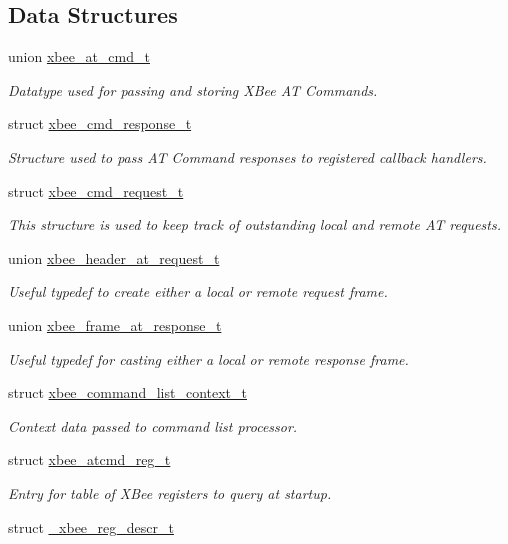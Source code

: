 \subsection*{Data Structures}
\begin{DoxyCompactItemize}
\item 
union \hyperlink{unionxbee__at__cmd__t}{xbee\-\_\-at\-\_\-cmd\-\_\-t}
\begin{DoxyCompactList}\small\item\em Datatype used for passing and storing X\-Bee A\-T Commands. \end{DoxyCompactList}\item 
struct \hyperlink{structxbee__cmd__response__t}{xbee\-\_\-cmd\-\_\-response\-\_\-t}
\begin{DoxyCompactList}\small\item\em Structure used to pass A\-T Command responses to registered callback handlers. \end{DoxyCompactList}\item 
struct \hyperlink{structxbee__cmd__request__t}{xbee\-\_\-cmd\-\_\-request\-\_\-t}
\begin{DoxyCompactList}\small\item\em This structure is used to keep track of outstanding local and remote A\-T requests. \end{DoxyCompactList}\item 
union \hyperlink{unionxbee__header__at__request__t}{xbee\-\_\-header\-\_\-at\-\_\-request\-\_\-t}
\begin{DoxyCompactList}\small\item\em Useful typedef to create either a local or remote request frame. \end{DoxyCompactList}\item 
union \hyperlink{unionxbee__frame__at__response__t}{xbee\-\_\-frame\-\_\-at\-\_\-response\-\_\-t}
\begin{DoxyCompactList}\small\item\em Useful typedef for casting either a local or remote response frame. \end{DoxyCompactList}\item 
struct \hyperlink{structxbee__command__list__context__t}{xbee\-\_\-command\-\_\-list\-\_\-context\-\_\-t}
\begin{DoxyCompactList}\small\item\em Context data passed to command list processor. \end{DoxyCompactList}\item 
struct \hyperlink{structxbee__atcmd__reg__t}{xbee\-\_\-atcmd\-\_\-reg\-\_\-t}
\begin{DoxyCompactList}\small\item\em Entry for table of X\-Bee registers to query at startup. \end{DoxyCompactList}\item 
struct \hyperlink{struct__xbee__reg__descr__t}{\-\_\-xbee\-\_\-reg\-\_\-descr\-\_\-t}
\end{DoxyCompactItemize}
